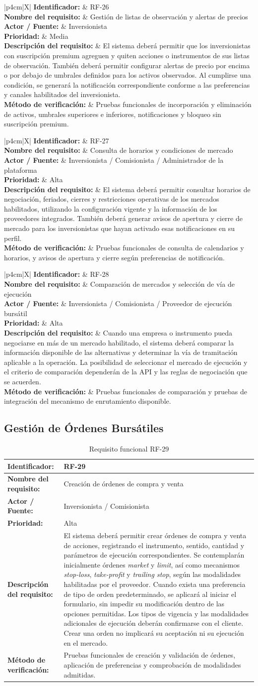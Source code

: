\documentclass[11pt,a4paper,oneside]{article}
\newcommand{\tablaRequisito}[6]{%
\begin{table}[H]
\centering
\begin{tabularx}{\linewidth}{|p{4cm}|X|}
\hline
\textbf{Identificador:} & #1 \\ \hline
\textbf{Nombre del requisito:} & #2 \\ \hline
\textbf{Actor / Fuente:} & #3 \\ \hline
\textbf{Prioridad:} & #4 \\ \hline
\textbf{Descripción del requisito:} &
#5 \\ \hline
\textbf{Método de verificación:} & #6 \\ \hline
\end{tabularx}
\caption{Requisito funcional #1}
\label{tab:#1}
\end{table}
}
\begin{document}
\tablaRequisito
{RF-26}
{Gestión de listas de observación y alertas de precios}
{Inversionista}
{Media}
{El sistema deberá permitir que los inversionistas con suscripción premium agreguen y quiten acciones o instrumentos de sus listas de observación. También deberá permitir configurar alertas de precio por encima o por debajo de umbrales definidos para los activos observados. Al cumplirse una condición, se generará la notificación correspondiente conforme a las preferencias y canales habilitados del inversionista.}
{Pruebas funcionales de incorporación y eliminación de activos, umbrales superiores e inferiores, notificaciones y bloqueo sin suscripción premium.}


\tablaRequisito
{RF-27}
{Consulta de horarios y condiciones de mercado}
{Inversionista / Comisionista / Administrador de la plataforma}
{Alta}
{El sistema deberá permitir consultar horarios de negociación, feriados, cierres y restricciones operativas de los mercados habilitados, utilizando la configuración vigente y la información de los proveedores integrados. También deberá generar avisos de apertura y cierre de mercado para los inversionistas que hayan activado esas notificaciones en su perfil.}
{Pruebas funcionales de consulta de calendarios y horarios, y avisos de apertura y cierre según preferencias de notificación.}


\tablaRequisito
{RF-28}
{Comparación de mercados y selección de vía de ejecución}
{Inversionista / Comisionista / Proveedor de ejecución bursátil}
{Alta}
{Cuando una empresa o instrumento pueda negociarse en más de un mercado habilitado, el sistema deberá comparar la información disponible de las alternativas y determinar la vía de tramitación aplicable a la operación. La posibilidad de seleccionar el mercado de ejecución y el criterio de comparación dependerán de la API y las reglas de negociación que se acuerden.}
{Pruebas funcionales de comparación y pruebas de integración del mecanismo de enrutamiento disponible.}


\subsection{Gestión de Órdenes Bursátiles}

\tablaRequisito
{RF-29}
{Creación de órdenes de compra y venta}
{Inversionista / Comisionista}
{Alta}
{El sistema deberá permitir crear órdenes de compra y venta de acciones, registrando el instrumento, sentido, cantidad y parámetros de ejecución correspondientes. Se contemplarán inicialmente órdenes \textit{market} y \textit{limit}, así como mecanismos \textit{stop-loss}, \textit{take-profit} y \textit{trailing stop}, según las modalidades habilitadas por el proveedor. Cuando exista una preferencia de tipo de orden predeterminado, se aplicará al iniciar el formulario, sin impedir su modificación dentro de las opciones permitidas. Los tipos de vigencia y las modalidades adicionales de ejecución deberán confirmarse con el cliente. Crear una orden no implicará su aceptación ni su ejecución en el mercado.}
{Pruebas funcionales de creación y validación de órdenes, aplicación de preferencias y comprobación de modalidades admitidas.}
\end{document}
